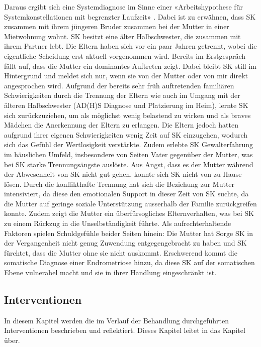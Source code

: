 Daraus ergibt sich eine Systemdiagnose im Sinne einer «Arbeitshypothese für Systemkonstellationen mit begrenzter Laufzeit» \cite{Spitzcok1999}. Dabei ist zu erwähnen, dass SK zusammen mit ihrem jüngeren Bruder zusammen bei der Mutter in einer Mietwohnung wohnt. SK besitzt eine älter Halbschwester, die zusammen mit ihrem Partner lebt. Die Eltern haben sich vor ein paar Jahren getrennt, wobei die eigentliche Scheidung erst aktuell vorgenommen wird. Bereits im Erstgespräch fällt auf, dass die Mutter ein dominantes Auftreten zeigt. Dabei bleibt SK still im Hintergrund und meldet sich nur, wenn sie von der Mutter oder von mir direkt angesprochen wird. Aufgrund der bereits sehr früh auftretenden familiären Schwierigkeiten durch die Trennung der Eltern wie auch im Umgang mit der älteren Halbschwester (AD(H)S Diagnose und Platzierung im Heim), lernte SK sich zurückzuziehen, um als möglichst wenig belastend zu wirken und als braves Mädchen die Anerkennung der Eltern zu erlangen. Die Eltern jedoch hatten aufgrund ihrer eigenen Schwierigkeiten wenig Zeit auf SK einzugehen, wodurch sich das Gefühl der Wertlosigkeit verstärkte. Zudem erlebte SK Gewalterfahrung im häuslichen Umfeld, insbesondere von Seiten Vater gegenüber der Mutter, was bei SK starke Trennungsängste auslöste. Aus Angst, dass es der Mutter während der Abwesenheit von SK nicht gut gehen, konnte sich SK nicht von zu Hause lösen. Durch die konflikthafte Trennung hat sich die Beziehung zur Mutter intensiviert, da diese den emotionalen Support in dieser Zeit von SK suchte, da die Mutter auf geringe soziale Unterstützung ausserhalb der Familie zurückgreifen konnte. Zudem zeigt die Mutter ein überfürsogliches Elternverhalten, was bei SK zu einem Rückzug in die Unselbständigkeit führte. Als aufrechterhaltende Faktoren spielen Schuldgefühle beider Seiten hinein: Die Mutter hat Sorge SK in der Vergangenheit nicht genug Zuwendung entgegengebracht zu haben und SK fürchtet, dass die Mutter ohne sie nicht auskommt. Erschwerend kommt die somatische Diagnose einer Endrometriose hinzu, da diese SK auf der somatischen Ebene vulnerabel macht und sie in ihrer Handlung eingeschränkt ist. 

\subsection{Interventionen} In diesem Kapitel werden die im Verlauf der Behandlung durchgeführten Interventionen beschrieben und reflektiert. Dieses Kapitel leitet in das Kapitel  über.

